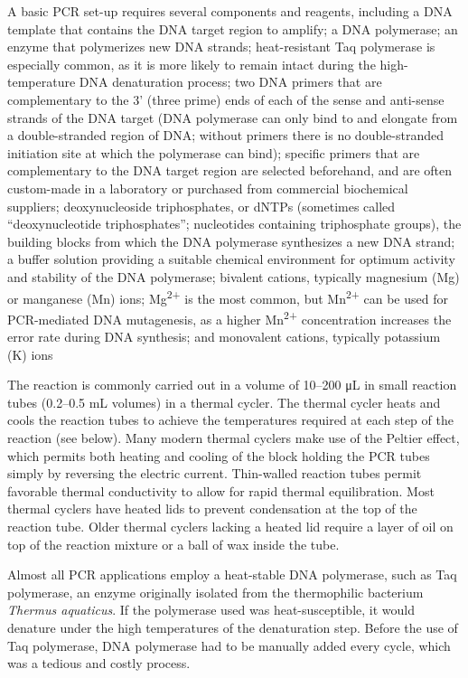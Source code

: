 A basic PCR set-up requires several components and reagents, including a DNA template that contains the DNA target region to amplify; a DNA polymerase; an enzyme that polymerizes new DNA strands; heat-resistant Taq polymerase is especially common, as it is more likely to remain intact during the high-temperature DNA denaturation process; two DNA primers that are complementary to the 3' (three prime) ends of each of the sense and anti-sense strands of the DNA target (DNA polymerase can only bind to and elongate from a double-stranded region of DNA; without primers there is no double-stranded initiation site at which the polymerase can bind); specific primers that are complementary to the DNA target region are selected beforehand, and are often custom-made in a laboratory or purchased from commercial biochemical suppliers; deoxynucleoside triphosphates, or dNTPs (sometimes called ``deoxynucleotide triphosphates''; nucleotides containing triphosphate groups), the building blocks from which the DNA polymerase synthesizes a new DNA strand; a buffer solution providing a suitable chemical environment for optimum activity and stability of the DNA polymerase; bivalent cations, typically magnesium (Mg) or manganese (Mn) ions; Mg\textsuperscript{2+} is the most common, but Mn\textsuperscript{2+} can be used for PCR-mediated DNA mutagenesis, as a higher Mn\textsuperscript{2+} concentration increases the error rate during DNA synthesis; and monovalent cations, typically potassium (K) ions

The reaction is commonly carried out in a volume of 10--200 μL in small reaction tubes (0.2--0.5 mL volumes) in a thermal cycler. The thermal cycler heats and cools the reaction tubes to achieve the temperatures required at each step of the reaction (see below). Many modern thermal cyclers make use of the Peltier effect, which permits both heating and cooling of the block holding the PCR tubes simply by reversing the electric current. Thin-walled reaction tubes permit favorable thermal conductivity to allow for rapid thermal equilibration. Most thermal cyclers have heated lids to prevent condensation at the top of the reaction tube. Older thermal cyclers lacking a heated lid require a layer of oil on top of the reaction mixture or a ball of wax inside the tube.

Almost all PCR applications employ a heat-stable DNA polymerase, such as Taq polymerase, an enzyme originally isolated from the thermophilic bacterium \emph{Thermus aquaticus}. If the polymerase used was heat-susceptible, it would denature under the high temperatures of the denaturation step. Before the use of Taq polymerase, DNA polymerase had to be manually added every cycle, which was a tedious and costly process.

